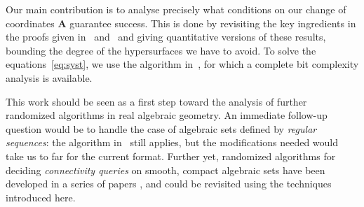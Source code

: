 \documentclass[sigconf]{acmart}
\def\mA{{\bm A}}
\def\C{\mathbb{C}}
\def\sing{ \textrm{sing}}
\def\reg{\textrm{reg}}
\begin{document}
Our main contribution is to analyse precisely what conditions on our
change of coordinates $\mA$ guarantee success. This is done by
revisiting the key ingredients in the proofs given
in~\cite{BaGiHeMb97} and~\cite{EMP} and giving quantitative versions
of these results, bounding the degree of the hypersurfaces we have to
avoid.  To solve the equations~\eqref{eq:syst}, we use the algorithm
in~\cite{SH}, for which a complete bit complexity analysis is
available.

This work should be seen as a first step toward the analysis of
further randomized algorithms in real algebraic geometry. An immediate
follow-up question would be to handle the case of algebraic sets
defined by {\em regular sequences}: the algorithm in~\cite{EMP} still
applies, but the modifications needed would take us to far for the
current format. Further yet, randomized algorithms for deciding {\em
  connectivity queries} on smooth, compact algebraic sets have been
developed in a series of papers
\cite{SchostMohabBabySteps2011,SchostMohabBabySteps2014}, and could be
revisited using the techniques introduced here.



\end{document}
